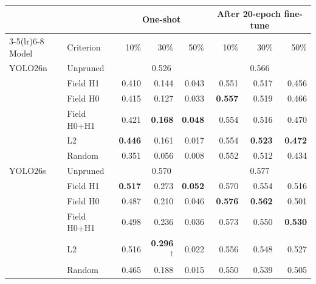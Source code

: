 \begin{tabular}{llrrrrrr}
\toprule
 & & \multicolumn{3}{c}{One-shot} & \multicolumn{3}{c}{After 20-epoch fine-tune} \\
\cmidrule(lr){3-5}\cmidrule(lr){6-8}
Model & Criterion & 10\% & 30\% & 50\% & 10\% & 30\% & 50\% \\
\midrule
YOLO26n & Unpruned & \multicolumn{3}{c}{0.526} & \multicolumn{3}{c}{0.566} \\
 & Field H1 & 0.410 & 0.144 & 0.043 & 0.551 & 0.517 & 0.456 \\
 & Field H0 & 0.415 & 0.127 & 0.033 & \textbf{0.557} & 0.519 & 0.466 \\
 & Field H0+H1 & 0.421 & \textbf{0.168} & \textbf{0.048} & 0.554 & 0.516 & 0.470 \\
 & L2 & \textbf{0.446} & 0.161 & 0.017 & 0.554 & \textbf{0.523} & \textbf{0.472} \\
 & Random & 0.351 & 0.056 & 0.008 & 0.552 & 0.512 & 0.434 \\
\midrule
YOLO26s & Unpruned & \multicolumn{3}{c}{0.570} & \multicolumn{3}{c}{0.577} \\
 & Field H1 & \textbf{0.517} & 0.273 & \textbf{0.052} & 0.570 & 0.554 & 0.516 \\
 & Field H0 & 0.487 & 0.210 & 0.046 & \textbf{0.576} & \textbf{0.562} & 0.501 \\
 & Field H0+H1 & 0.498 & 0.236 & 0.036 & 0.573 & 0.550 & \textbf{0.530} \\
 & L2 & 0.516 & \textbf{0.296}$^\dagger$ & 0.022 & 0.556 & 0.548 & 0.527 \\
 & Random & 0.465 & 0.188 & 0.015 & 0.550 & 0.539 & 0.505 \\
\bottomrule
\end{tabular}
